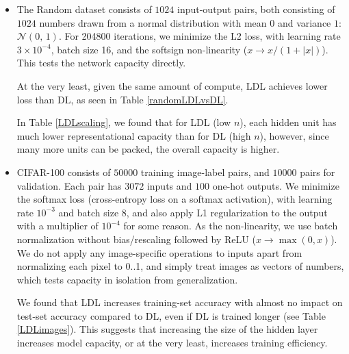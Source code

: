\documentclass{article}
\begin{document}
\begin{itemize}
\item The Random dataset consists of $1024$ input-output pairs, both consisting of $1024$ numbers drawn from a normal distribution with mean $0$ and variance $1$: $\mathcal{N}(0,\,1)$. For 204800 iterations, we minimize the L2 loss, with learning rate $3 \times 10^{-4}$, batch size 16, and the softsign non-linearity ($x \rightarrow x/(1+|x|)$). This tests the network capacity directly.

At the very least, given the same amount of compute, LDL achieves lower loss than DL, as seen in Table \ref{randomLDLvsDL}.

In Table \ref{LDLscaling}, we found that for LDL (low $n$), each hidden unit has much lower representational capacity than for DL (high $n$), however, since many more units can be packed, the overall capacity is higher.

\item CIFAR-100 consists of $50000$ training image-label pairs, and $10000$ pairs for validation. Each pair has $3072$ inputs and $100$ one-hot outputs. We minimize the softmax loss (cross-entropy loss on a softmax activation), with learning rate $10^{-3}$ and batch size 8, and also apply L1 regularization to the output with a multiplier of $10^{-4}$ for some reason. As the non-linearity, we use batch normalization \cite{ioffe2015batch} without bias/rescaling followed by ReLU ($x \rightarrow \max(0,x)$). We do not apply any image-specific operations to inputs apart from normalizing each pixel to 0..1, and simply treat images as vectors of numbers, which tests capacity in isolation from generalization.

We found that LDL increases training-set accuracy with almost no impact on test-set accuracy compared to DL, even if DL is trained longer (see Table \ref{LDLimages}). This suggests that increasing the size of the hidden layer increases model capacity, or at the very least, increases training efficiency.
\end{itemize}
\end{document}
